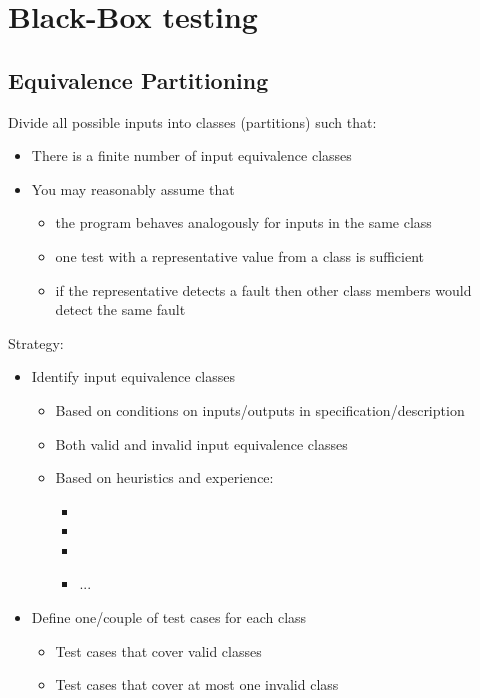 \section{Black-Box testing}
		
\subsection{Equivalence Partitioning}
	
Divide all possible inputs into classes (partitions) such that:
\begin{itemize}
	\item There is a finite number of input equivalence classes
	\item You may reasonably assume that
	\begin{itemize}
		\item the program behaves analogously for inputs in the same class
		\item one test with a representative value from a class is sufficient
		\item if the representative detects a fault
		then other class members would detect the same fault
	\end{itemize}
\end{itemize}
				
				
Strategy:
\begin{itemize}
	\item Identify input equivalence classes
	\begin{itemize}
		\item Based on conditions on inputs/outputs in specification/description
		\item Both valid and invalid input equivalence classes
		\item Based on heuristics and experience:
		\begin{itemize}
			\item
			\item
			\item
			\item ...
		\end{itemize}
	\end{itemize}
	\item Define one/couple of test cases for each class
	\begin{itemize}
		\item Test cases that cover valid classes
		\item Test cases that cover at most one invalid class
	\end{itemize}
\end{itemize}
				
